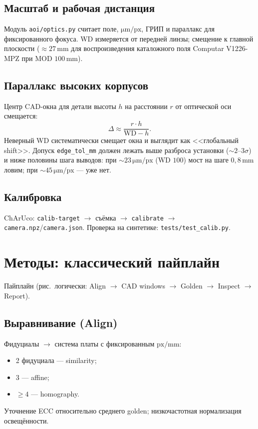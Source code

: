 \documentclass[12pt,a4paper]{article}
\begin{document}
\subsection{Масштаб и рабочая дистанция}
Модуль \texttt{aoi/optics.py} считает поле, \(\mathrm{\mu m/px}\), ГРИП и
параллакс для фиксированного фокуса. WD измеряется от передней линзы;
смещение к главной плоскости (\(\approx 27\,\mathrm{mm}\) для воспроизведения
каталожного поля Computar V1226-MPZ при MOD \(100\,\mathrm{mm}\)).

\subsection{Параллакс высоких корпусов}
Центр CAD-окна для детали высоты \(h\) на расстоянии \(r\) от оптической оси
смещается:
\begin{equation}
  \Delta \approx \frac{r \cdot h}{\mathrm{WD}-h}.
\end{equation}
Неверный WD систематически смещает окна и выглядит как <<глобальный shift>>.
Допуск \texttt{edge\_tol\_mm} должен лежать выше разброса установки
(\(\sim 2\)--\(3\sigma\)) и ниже половины шага выводов: при
\(\sim 23\,\mathrm{\mu m/px}\) (WD \(100\)) мост на шаге \(0{,}8\,\mathrm{mm}\)
ловим; при \(\sim 45\,\mathrm{\mu m/px}\) --- уже нет.

\subsection{Калибровка}
ChArUco: \texttt{calib-target} \(\to\) съёмка \(\to\) \texttt{calibrate}
\(\to\) \texttt{camera.npz}/\texttt{camera.json}. Проверка на синтетике:
\texttt{tests/test\_calib.py}.

\section{Методы: классический пайплайн}
\label{sec:classical}

Пайплайн (рис.~логически: Align \(\to\) CAD windows \(\to\) Golden \(\to\)
Inspect \(\to\) Report).

\subsection{Выравнивание (Align)}
Фидуциалы \(\to\) система платы с фиксированным \(\mathrm{px/mm}\):
\begin{itemize}[leftmargin=1.5em,itemsep=0.15em]
  \item 2 фидуциала --- similarity;
  \item 3 --- affine;
  \item \(\ge 4\) --- homography.
\end{itemize}
Уточнение ECC относительно среднего golden; низкочастотная нормализация
освещённости.
\end{document}
